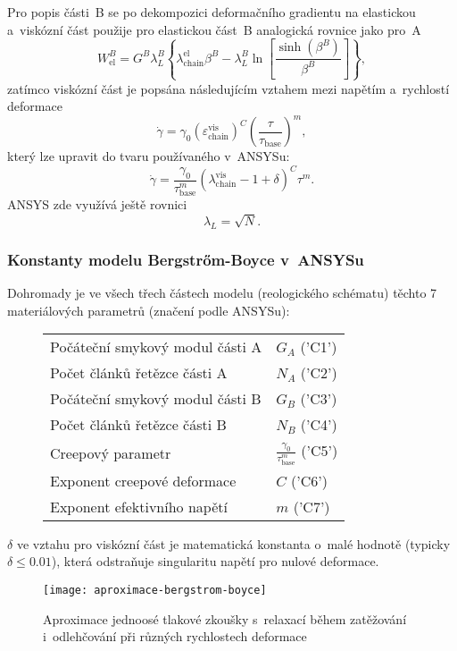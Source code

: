 Pro popis části~B se po dekompozici deformačního gradientu na elastickou a~viskózní část použije pro elastickou část~B analogická rovnice jako pro~A
\begin{equation}
	W_\text{el}^B = G^B \lambda_L^B \left\{ \lambda_\text{chain}^\text{el} \beta^B - \lambda_L^B \ln\left[ \frac{\sinh\left(\beta^B\right)}{\beta^B} \right] \right\},
\end{equation}
zatímco viskózní část je popsána následujícím vztahem mezi napětím a~rychlostí deformace
\begin{equation}
	\dot{\gamma} = \gamma_0 \left( \varepsilon_\text{chain}^\text{vis} \right)^C \left( \frac{\tau}{\tau_\text{base}} \right)^m,
\end{equation}
který lze upravit do tvaru používaného v~ANSYSu:
\begin{equation}
	\dot{\gamma} = \frac{\gamma_0}{\tau_\text{base}^m} \left( \lambda_\text{chain}^\text{vis} - 1 + \delta \right)^C \tau^m.
\end{equation}
ANSYS zde využívá ještě rovnici
\begin{equation}
	\lambda_L = \sqrt{N}.
\end{equation}

\subsubsection{Konstanty modelu Bergstrőm-Boyce v~ANSYSu}
Dohromady je ve všech třech částech modelu (reologického schématu) těchto 7 materiálových parametrů (značení podle ANSYSu):
\begin{figure}[H]\label{tab:konstanty-bergstrom-boyce}
	\centering
	\begin{tabular}{ll}\toprule
		Počáteční smykový modul části A & $G_A$ ('C1')\\
		Počet článků řetězce části A & $N_A$ ('C2')\\
		Počáteční smykový modul části B & $G_B$ ('C3')\\
		Počet článků řetězce části B & $N_B$ ('C4')\\
		Creepový parametr & $\tfrac{\gamma_0}{\tau_\text{base}^m}$ ('C5')\\
		Exponent creepové deformace & $C$ ('C6')\\
		Exponent efektivního napětí & $m$ ('C7')\\
	\bottomrule\end{tabular}
\end{figure}

$\delta$ ve vztahu pro viskózní část je matematická konstanta o~malé hodnotě (typicky $\delta \leq \num{0.01}$), která odstraňuje singularitu napětí pro nulové deformace.

\begin{figure}[H]
	\centering
	\texttt{[image: aproximace-bergstrom-boyce]}
	\caption{Aproximace jednoosé tlakové zkoušky s~relaxací během zatěžování i~odlehčování při různých rychlostech deformace}
	\label{fig:aproximace-bergstrom-boyce}
\end{figure}

